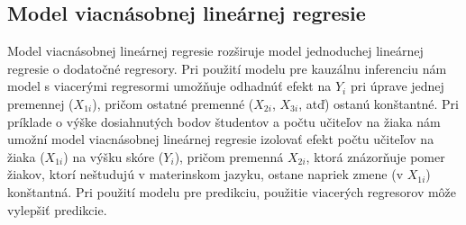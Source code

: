 \documentclass[]{tukediphc}
\begin{document}
\subsection{Model viacnásobnej lineárnej regresie}

Model viacnásobnej lineárnej regresie rozširuje model jednoduchej lineárnej regresie o dodatočné regresory. Pri použití modelu pre kauzálnu inferenciu nám model s viacerými regresormi umožňuje odhadnúť efekt na $Y_{i}$ pri úprave jednej premennej ($X_{1i}$), pričom ostatné premenné ($X_{2i}$, $X_{3i}$, atď) ostanú konštantné. Pri príklade o výške dosiahnutých bodov študentov a počtu učiteľov na žiaka nám umožní model viacnásobnej lineárnej regresie izolovať efekt počtu učiteľov na žiaka ($X_{1i}$) na výšku skóre ($Y_{i}$), pričom premenná $X_{2i}$, ktorá znázorňuje pomer žiakov, ktorí neštudujú v materinskom jazyku, ostane napriek zmene (v $X_{1i}$) konštantná. Pri použití modelu pre predikciu, použitie viacerých regresorov môže vylepšiť predikcie. 








%

%

%

%

%

%

%
\newpage
{}
\protect\label{page:posledna}
\end{document}
